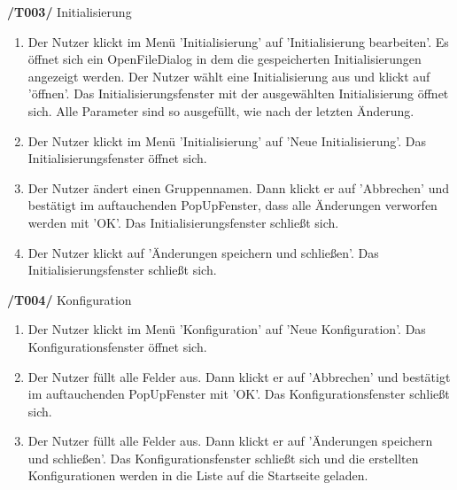 \textbf{/T003/} Initialisierung
\begin{enumerate}
\item {}
{Der Nutzer klickt im Menü 'Initialisierung' auf 'Initialisierung bearbeiten'. Es öffnet sich ein OpenFileDialog in dem die gespeicherten Initialisierungen angezeigt werden. Der Nutzer wählt eine Initialisierung aus und klickt auf 'öffnen'.}
{Das Initialisierungsfenster mit der ausgewählten Initialisierung öffnet sich. Alle Parameter sind so ausgefüllt, wie nach der letzten Änderung.}


\item {}
{Der Nutzer klickt im Menü 'Initialisierung' auf 'Neue Initialisierung'.}
{Das Initialisierungsfenster öffnet sich.}

\item {}
{Der Nutzer ändert einen Gruppennamen. Dann klickt er auf 'Abbrechen' und bestätigt im auftauchenden PopUpFenster, dass alle Änderungen verworfen werden mit 'OK'.}
{Das Initialisierungsfenster schließt sich.}

\item {}
{Der Nutzer klickt auf 'Änderungen speichern und schließen'.}
{Das Initialisierungsfenster schließt sich.}


\end{enumerate}

\textbf{/T004/} Konfiguration
\begin{enumerate}

\item {}
{Der Nutzer klickt im Menü 'Konfiguration' auf 'Neue Konfiguration'.}
{Das Konfigurationsfenster öffnet sich.}

\item {}
{Der Nutzer füllt alle Felder aus. Dann klickt er auf 'Abbrechen' und bestätigt im auftauchenden PopUpFenster mit 'OK'.}
{Das Konfigurationsfenster schließt sich.}

\item {}
{Der Nutzer füllt alle Felder aus. Dann klickt er auf 'Änderungen speichern und schließen'.}
{Das Konfigurationsfenster schließt sich und die erstellten Konfigurationen werden in die Liste auf die Startseite geladen.}

\end{enumerate}


